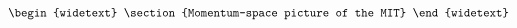 \documentclass[reprint,hidelinks]{revtex4-2}
\begin{document}
\begin{widetext}
\begin{equation}
\begin{aligned}
\begin{widetext}
\section{Momentum-space picture of the MIT}
%
%

\end{widetext}
\end{aligned}
\end{equation}
\end{widetext}
\end{document}
